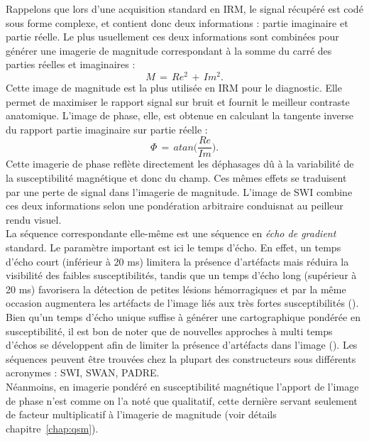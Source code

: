 Rappelons que lors d’une acquisition standard en IRM, le signal récupéré est codé sous forme complexe, et contient donc deux informations : partie imaginaire et partie réelle. Le plus usuellement ces deux informations sont combinées pour générer une imagerie de magnitude correspondant à la somme du carré des parties réelles et imaginaires :
\begin{equation}
M\,=\,Re^2\,+\,Im^2.
\end{equation}
Cette image de magnitude est la plus utilisée en IRM pour le diagnostic. Elle permet de maximiser le rapport signal sur bruit et fournit le meilleur contraste anatomique. L’image de phase, elle, est obtenue en calculant la tangente inverse du rapport partie imaginaire sur partie réelle :
\begin{equation}
\Phi\,=\,atan\biggl(\frac{Re}{Im}\biggr).
\end{equation}
Cette imagerie de phase reflète directement les déphasages dû à la variabilité de la susceptibilité magnétique et donc du champ. Ces mêmes effets se traduisent par une perte de signal dans l’imagerie de magnitude. L'image de SWI combine ces deux informations selon une pondération arbitraire conduisnat au peilleur rendu visuel. \\
La séquence correspondante elle-même est une séquence en {\em écho de gradient} standard. Le paramètre important est ici le temps d’écho. En effet, un temps d’écho court (inférieur à 20 ms) limitera la présence d’artéfacts mais réduira la visibilité des faibles susceptibilités, tandis que un temps d’écho long (supérieur à 20 ms) favorisera la détection de petites lésions hémorragiques et par la même occasion augmentera les artéfacts de l’image liés aux très fortes susceptibilités (\cite{Kressler2010}). Bien qu’un temps d’écho unique suffise à générer une cartographique pondérée en susceptibilité, il est bon de noter que de nouvelles approches à multi temps d’échos se développent afin de limiter la présence d’artéfacts dans l’image (\cite{Oh2013}). Les séquences peuvent être trouvées chez la plupart des constructeurs sous différents acronymes : SWI, SWAN, PADRE.\\
Néanmoins, en imagerie pondéré en susceptibilité magnétique l’apport de l’image de phase n’est comme on l'a noté que qualitatif, cette dernière servant seulement de facteur multiplicatif à l’imagerie de magnitude (voir détails chapitre~\ref{chap:qsm}).\\
